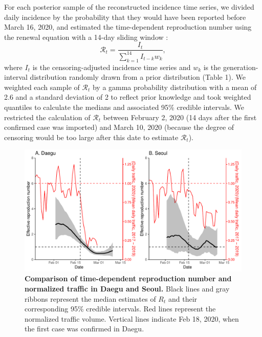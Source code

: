 \documentclass[12pt]{article}
\begin{document}
For each posterior sample of the reconstructed incidence time series, we divided daily incidence by the probability that they would have been reported before March 16, 2020, and estimated the time-dependent reproduction number using the renewal equation with a 14-day sliding window \citep{fraser2007estimating}:
\begin{equation}
\mathcal R_t = \frac{I_t}{\sum_{k=1}^{14} I_{t-k} w_k},
\end{equation}
where $I_t$ is the censoring-adjusted incidence time series and $w_k$ is the generation-interval distribution randomly drawn from a prior distribution (Table 1).
We weighted each sample of $\mathcal R_t$ by a gamma probability distribution with a mean of 2.6 and a standard deviation of 2 to reflect prior knowledge \citep{tempvar} and took weighted quantiles to calculate the medians and associated 95\% credible intervals.
We restricted the calculation of $\mathcal R_t$ between February 2, 2020 (14 days after the first confirmed case was imported) and March 10, 2020 (because the degree of censoring would be too large after this date to estimate $\mathcal R_t$).

\begin{figure}[!ht]
\includegraphics[width=\textwidth]{figure_compare_R_t.pdf}
\caption{
\textbf{Comparison of time-dependent reproduction number and normalized traffic in Daegu and Seoul.}
Black lines and gray ribbons represent the median estimates of $R_t$ and their corresponding 95\% credible intervals.
Red lines represent the normalized traffic volume.
Vertical lines indicate Feb 18, 2020, when the first case was confirmed in Daegu.
}
\label{fig:eff}
\end{figure}
\end{document}
